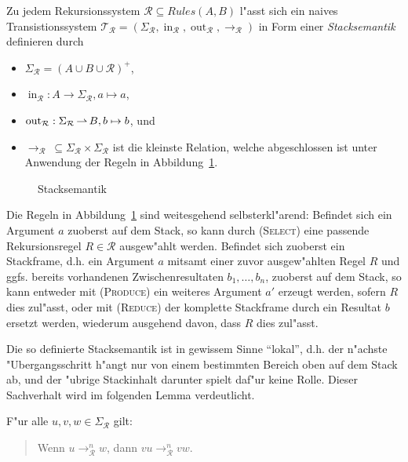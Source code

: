 \documentclass[12pt,a4paper,final]{article}
\begin{document}
Zu jedem Rekursionssystem \mbox{$\mathcal{R} \subseteq \mathit{Rules}(A,B)$} l"asst sich ein naives Transistionssystem
\mbox{$\mathcal{T}_{\mathcal{R}} = (\Sigma_{\mathcal{R}},\operatorname{in}_{\mathcal{R}},\operatorname{out}_{\mathcal{R}},\rightarrow_{\mathcal{R}} )$}
in Form einer \emph{Stacksemantik} definieren durch
\begin{itemize}
\item $\Sigma_{\mathcal{R}} = (A \cup B \cup \mathcal{R})^+$,
\item $\operatorname{in}_{\mathcal{R}}: A \to \Sigma_{\mathcal{R}}, a \mapsto a$,
\item $\operatorname{out}_{\mathcal{R}}: \Sigma_{\mathcal{R}} \operatorname{\rightharpoonup} B, b \mapsto b$, und
\item $\rightarrow_{\mathcal{R}}\ \subseteq \Sigma_{\mathcal{R}} \times \Sigma_{\mathcal{R}}$ ist die kleinste
  Relation, welche abgeschlossen ist unter Anwendung der Regeln in Abbildung~\ref{fig:Stacksemantik}.
\end{itemize}
\begin{figure}[htb]
  \centering
  \caption{Stacksemantik}
  \label{fig:Stacksemantik}
\end{figure}
Die Regeln in Abbildung~\ref{fig:Stacksemantik} sind weitesgehend selbsterkl"arend: Befindet
sich ein Argument $a$ zuoberst auf dem Stack, so kann durch \textsc{(Select)} eine
passende Rekursionsregel \mbox{$R \in \mathcal{R}$} ausgew"ahlt werden. Befindet sich zuoberst
ein Stackframe, d.h.\xspace ein Argument $a$ mitsamt einer zuvor ausgew"ahlten Regel $R$ und ggfs.\xspace
bereits vorhandenen Zwischenresultaten \mbox{$b_1,\ldots,b_n$}, zuoberst auf dem Stack, so
kann entweder mit \textsc{(Produce)} ein weiteres Argument $a'$ erzeugt werden, sofern $R$ dies
zul"asst, oder mit \textsc{(Reduce)} der komplette Stackframe durch ein Resultat $b$ ersetzt
werden, wiederum ausgehend davon, dass $R$ dies zul"asst.

Die so definierte Stacksemantik ist in gewissem Sinne ``lokal'', d.h.\xspace der n"achste "Ubergangsschritt
h"angt nur von einem bestimmten Bereich oben auf dem Stack ab, und der "ubrige Stackinhalt darunter
spielt daf"ur keine Rolle. Dieser Sachverhalt wird im folgenden Lemma verdeutlicht.
\begin{lemma}[Lokalit"at]
  F"ur alle \mbox{$u,v,w \in \Sigma_{\mathcal{R}}$} gilt:
  \begin{quote}
    Wenn \mbox{$u \rightarrow_{\mathcal{R}}^n w$}, dann \mbox{$vu \rightarrow_{\mathcal{R}}^n vw$}.
  \end{quote}
\end{lemma}
\end{document}
